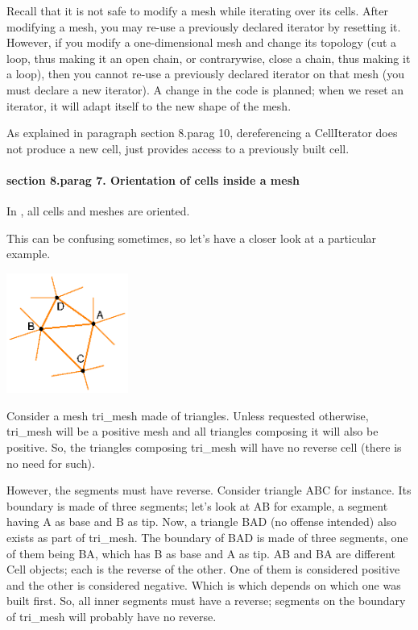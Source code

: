 Recall that it is not safe to modify a mesh while iterating over its cells.
After modifying a mesh, you may re-use a previously declared iterator by {\codett reset}ting it.
However, if you modify a one-dimensional mesh and change its topology
(cut a loop, thus making it an open chain, or contrarywise, close a chain,
thus making it a loop), then you cannot re-use
a previously declared iterator on that mesh (you must declare a new iterator).
A change in the code is planned; when we {\codett reset} an iterator, it will adapt itself
to the new shape of the mesh.

As explained in paragraph \numb section 8.\numb parag 10, dereferencing a {\codett CellIterator}
does not produce a new cell, just provides access to a previously built cell.


\paragraph{\numb section 8.\numb parag 7. Orientation of cells inside a mesh}

In \maniFEM, all cells and meshes are oriented.

This can be confusing sometimes, so let's have a closer look at a particular example.

{ 
\centerline{\includegraphics[width=4cm]{malha-tri.eps}} }

Consider a mesh {\codett tri\_mesh} made of triangles.
Unless requested otherwise, {\codett tri\_mesh} will be a positive mesh and all triangles
composing it will also be positive.
So, the triangles composing {\codett tri\_mesh} will have no reverse cell
(there is no need for such).

However, the segments must have reverse.
Consider triangle {\codett ABC} for instance.
Its boundary is made of three segments; let's look at {\codett AB} for example,
a segment having {\codett A} as base and {\codett B} as tip.
Now, a triangle {\codett BAD} (no offense intended) also exists as part of {\codett tri\_mesh}.
The boundary of {\codett BAD} is made of three segments, one of them being {\codett BA},
which has {\codett B} as base and {\codett A} as tip.
{\codett AB} and {\codett BA} are different {\codett Cell} objects;
each is the reverse of the other.
One of them is considered positive and the other is considered negative.
Which is which depends on which one was built first.
So, all inner segments must have a reverse;
segments on the boundary of {\codett tri\_mesh} will probably have no reverse.

